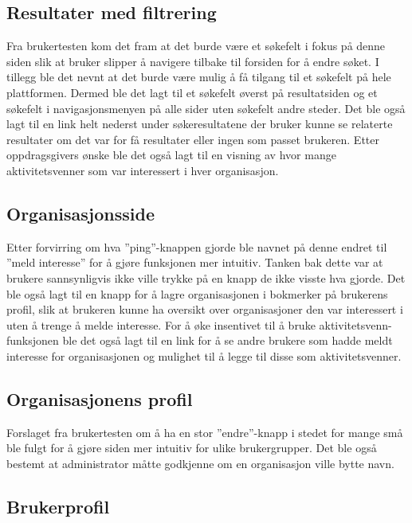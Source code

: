 \subsection{Resultater med filtrering}

Fra brukertesten kom det fram at det burde være et søkefelt i fokus på denne siden slik at bruker slipper å navigere tilbake til forsiden for å endre søket. I tillegg ble det nevnt at det burde være mulig å få tilgang til et søkefelt på hele plattformen. Dermed ble det lagt til et søkefelt øverst på resultatsiden og et søkefelt i navigasjonsmenyen på alle sider uten søkefelt andre steder. Det ble også lagt til en link helt nederst under søkeresultatene der bruker kunne se relaterte resultater om det var for få resultater eller ingen som passet brukeren. Etter oppdragsgivers ønske ble det også lagt til en visning av hvor mange aktivitetsvenner som var interessert i hver organisasjon.

\subsection{Organisasjonsside}

Etter forvirring om hva ''ping''-knappen gjorde ble navnet på denne endret til ''meld interesse'' for å gjøre funksjonen mer intuitiv. Tanken bak dette var at brukere sannsynligvis ikke ville trykke på en knapp de ikke visste hva gjorde. Det ble også lagt til en knapp for å lagre organisasjonen i bokmerker på brukerens profil, slik at brukeren kunne ha oversikt over organisasjoner den var interessert i uten å trenge å melde interesse. For å øke insentivet til å bruke aktivitetsvenn-funksjonen ble det også lagt til en link for å se andre brukere som hadde meldt interesse for organisasjonen og mulighet til å legge til disse som aktivitetsvenner.

\subsection{Organisasjonens profil}

Forslaget fra brukertesten om å ha en stor ''endre''-knapp i stedet for mange små ble fulgt for å gjøre siden mer intuitiv for ulike brukergrupper. Det ble også bestemt at administrator måtte godkjenne om en organisasjon ville bytte navn.

\subsection{Brukerprofil}
 
